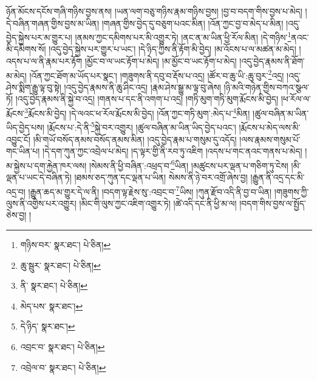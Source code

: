 ཉོན་མོངས་དངོས་གཞི་གཉིས་བྱས་ནས། །ཡན་ལག་བཅུ་གཉིས་རྣམ་གཉིས་བྱས། །བྱ་བ་བདག་གིས་བྱས་པ་མེད། །དེ་བཞིན་གཞན་གྱིས་བྱས་མ་ཡིན། །གཞན་གྱིས་བྱེད་དུ་བཅུག་པའང་མིན། །འོན་ཀྱང་བྱ་བ་མེད་པ་མིན། །འདུ་བྱེད་སྐྱེས་པར་མ་གྱུར་པ། །ནམས་ཀྱང་དམིགས་པར་མི་འགྱུར་ཏེ། །ནང་ན་མ་ཡིན་ཕྱི་རོལ་མིན། །དེ་གཉིས་\footnote{གཉིས་བར་  སྣར་ཐང་།  པེ་ཅིན། }ནའང་མི་དམིགས་སོ། །འདུ་བྱེད་སྐྱེས་པར་གྱུར་པ་ཡང་། །དེ་ཉིད་ཀྱིས་ནི་རྟོག་མི་བྱེད། །མ་འོངས་པ་ལ་མཚན་མ་མེད། །འདས་པ་ལ་ནི་རྣམ་པར་རྟོག །མྱོང་བ་ལ་ཡང་རྟོག་པ་མེད། །མ་མྱོང་བ་ཡང་རྟོག་པ་མེད། །འདུ་བྱེད་རྣམས་ནི་ཐོག་མ་མེད། །འོན་ཀྱང་ཐོག་མ་ཡོད་པར་སྣང་། །གཟུགས་ནི་དབུ་བ་རྡོས་པ་འདྲ། །ཚོར་བ་ཆུ་ཡི་:ཆུ་བུར་\footnote{ཆུ་སྦུར་  སྣར་ཐང་།  པེ་ཅིན། }འདྲ། །འདུ་ཤེས་སྨིག་རྒྱུ་ལྟ་བུ་སྟེ། །འདུ་བྱེད་རྣམས་ནི་ཆུ་ཤིང་འདྲ། །རྣམ་ཤེས་སྒྱུ་མ་ལྟ་བུ་ཞེས། །ཉི་མའི་གཉེན་གྱིས་བཀའ་སྩལ་ཏོ། །འདུ་བྱེད་རྣམས་ནི་སྐྱེ་བ་འདྲ། །གནས་པ་དང་ནི་འགག་པ་འདྲ། །གཏི་མུག་གཏི་མུག་རྨོངས་མི་བྱེད། །ཕ་རོལ་ལ་རྨོངས་\footnote{ནི་  སྣར་ཐང་།  པེ་ཅིན། }རྨོངས་མི་བྱེད། །དེ་ལའང་ཕ་རོལ་རྨོངས་མི་བྱེད། །འོན་ཀྱང་གཏི་མུག་:མེད་པ་\footnote{མེད་པས་  སྣར་ཐང་། }མིན། །ཚུལ་བཞིན་མ་ཡིན་ཡིད་བྱེད་པས། །རྨོངས་པ་:དེ་ནི་\footnote{དེ་ཉིད་  སྣར་ཐང་། }སྐྱེ་བར་འགྱུར། །ཚུལ་བཞིན་མ་ཡིན་ཡིད་བྱེད་པའང་། །རྨོངས་པ་མེད་ལས་མི་འབྱུང་ངོ། །མི་གཡོ་བསོད་ནམས་བསོད་ནམས་མིན། །འདུ་བྱེད་རྣམ་པ་གསུམ་དུ་འདོད། །ལས་རྣམས་གསུམ་པོ་གང་ཡིན་པ། །དེ་དག་ཀུན་ཀྱང་འབྲེལ་པ་མེད། །ད་ལྟར་གྱི་ནི་རབ་ཏུ་འཇིག །འདས་པ་གང་ནའང་གནས་པ་མེད། །མ་སྐྱེས་པ་དག་རྐྱེན་ཁར་ལས། །སེམས་ནི་ཕྱི་བཞིན་:འཕྲད་བ་\footnote{འབྲང་བ་  སྣར་ཐང་།  པེ་ཅིན། }ཡིན། །མཚུངས་པར་ལྡན་པ་གཅིག་ཏུ་ངེས། །མི་ལྡན་པ་ཡང་དེ་བཞིན་ཏེ། །ཐམས་ཅད་ཀུན་དང་ལྡན་པ་ཡིན། སེམས་ནི་ཉེ་བར་འགྲོ་ཞེས་བྱ། །རྒྱུན་ནི་འདྲ་དང་མི་འདྲ་བ། །རྒྱུན་ཆད་མ་གྱུར་དེ་ལ་ནི། །བདག་ལྟ་རྗེས་སུ་:འབྲང་བ་\footnote{འབྲེལ་བ་  སྣར་ཐང་།  པེ་ཅིན། }ཡིས། །ཀུན་རྫོབ་འདི་ནི་བྱ་བ་ཡིན། །གཟུགས་ཀྱི་ལུས་ནི་འགྱེས་པར་འགྱུར། །མིང་གི་ལུས་ཀྱང་འཇིག་འགྱུར་ཏེ། །ཚེ་འདི་དང་ནི་ཕྱི་མ་ལ། །བདག་གིས་བྱས་ལ་སྤྱོད་ཅེས་བྱ། །
